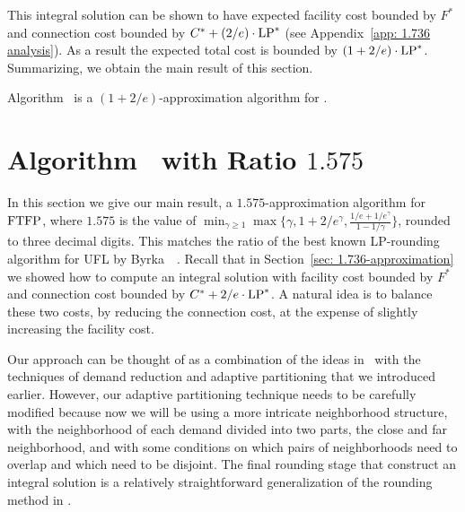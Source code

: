 \documentclass{llncs}
\begin{document}
This integral solution can be shown to have expected facility cost
bounded by $F^\ast$ and connection cost bounded by $C^\ast +
(2/e)\cdot \mbox{\rm LP}^\ast$ (see Appendix~\ref{app: 1.736 analysis}). As a
result the expected total cost is bounded by $(1 + 2/e)\cdot
\mbox{\rm LP}^\ast$. Summarizing, we obtain the main result of this section.
\begin{theorem}\label{thm:1736}
  Algorithm~{\ECHS} is a $(1+2/e)$-approximation algorithm for \FTFP.
\end{theorem}



\section{Algorithm~{\EBGS} with Ratio $1.575$}\label{sec: 1.575-approximation}

In this section we give our main result, a $1.575$-approximation
algorithm for $\mbox{\rm FTFP}$, where $1.575$ is the value of $\min_{\gamma\geq
  1}\max\{\gamma, 1+2/e^\gamma, \frac{1/e+1/e^\gamma}{1-1/\gamma}\}$,
rounded to three decimal digits. This matches the ratio of the best
known LP-rounding algorithm for UFL by
Byrka~{\etal}~\cite{ByrkaGS10}. Recall that in Section~\ref{sec:
  1.736-approximation} we showed how to compute an integral solution
with facility cost bounded by $F^\ast$ and connection cost bounded by
$C^\ast + 2/e\cdot\mbox{\rm LP}^\ast$. A natural idea is to balance these two
costs, by reducing the connection cost, at the expense of slightly
increasing the facility cost.

Our approach can be thought of as a combination of the ideas
in~\cite{ByrkaGS10} with the techniques of demand reduction and
adaptive partitioning that we introduced earlier. However, our
adaptive partitioning technique needs to be carefully modified because
now we will be using a more intricate neighborhood structure, with the
neighborhood of each demand divided into two parts, the close and far
neighborhood, and with some conditions on which pairs of neighborhoods
need to overlap and which need to be disjoint. The final rounding
stage that construct an integral solution is a relatively
straightforward generalization of the rounding method in
\cite{ByrkaGS10}.
\end{document}

